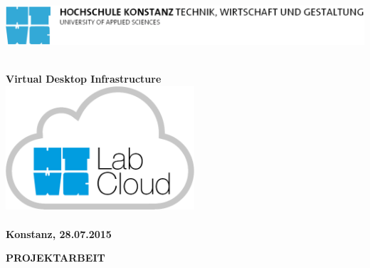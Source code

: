 \begin{titlepage}

\vspace*{-3.5cm}

\begin{flushleft}
\hspace*{-1cm} \includegraphics[width=15.7cm]{include/htwg-logo.pdf}
\end{flushleft}

\vspace{2cm}

\begin{center}
	\huge{
		\textbf{\thema} \\[0.3cm]
	}
	\large{
		\textbf{Virtual Desktop Infrastructure} \\[2cm]
	}
	\includegraphics[width=7cm]{img/logo.png} \\[2cm]
	\Large{
		\textbf{\studiengang}
	}\\[1cm]
	\large{
		\textbf{Konstanz, 28.07.2015} \\[2.5cm]
	}
	
	\Huge{
		\textbf{{\sf PROJEKTARBEIT}}
	}
\end{center}

\end{titlepage}